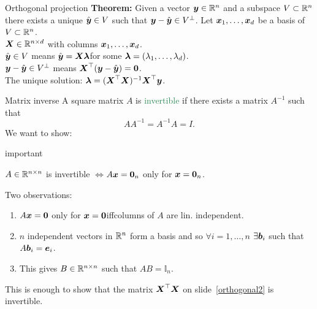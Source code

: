 \documentclass[11pt,aspectratio=169]{beamer}
\begin{document}
\begin{frame}[label=orthogonal2]{Orthogonal projection}
		\textbf{Theorem: }Given a vector $\boldsymbol y\in \mathbb R^n$ and a subspace $V\subset \mathbb R^n$ there exists a unique $\hat{\boldsymbol y}\in V$ such that \;\;$\boldsymbol y-\hat{\boldsymbol y}\in V^\perp$.
	Let $\boldsymbol x_1,\ldots,\boldsymbol x_d$ be a basis of $V\subset \mathbb R^n$.\\[.3cm]
	$\boldsymbol X\in \mathbb R^{n\times d}$ with columns  $\boldsymbol x_1,\ldots,\boldsymbol x_d$.\\[.5cm]
	$\hat{\boldsymbol y}\in V$ means \quad $\hat{\boldsymbol y}=\boldsymbol X\boldsymbol \lambda$\quad  for some $\boldsymbol \lambda=(\lambda_1,\ldots,\lambda_d)$.\\[.3cm]
	$\boldsymbol y-\hat{\boldsymbol y}\in V^\perp$ \quad means \quad $\boldsymbol X^\top(\boldsymbol y-\hat{\boldsymbol y})=\boldsymbol 0$.\\[.5cm]
	The unique solution: \quad $\boldsymbol \lambda=(\boldsymbol X^\top \boldsymbol X)^{-1}\boldsymbol X^\top\boldsymbol y$.
\end{frame}


\begin{frame}{Matrix inverse}
A square matrix $A$ is \textcolor{SeaGreen}{invertible} if there exists a matrix $A^{-1}$ such that
$$
A A^{-1}=A^{-1}A=I.
$$
	We want to show:
		\begin{beamercolorbox}[wd=\paperwidth,sep=0pt]{important}	
		\begin{center}
$A\in \mathbb R^{n\times n}$ is invertible \quad $\Longleftrightarrow$\quad $A\boldsymbol x=\boldsymbol 0_n$ only for $\boldsymbol x= \boldsymbol 0_n$.		
		\end{center}
\end{beamercolorbox}
Two observations:
\begin{enumerate}
	\item $A\boldsymbol x=\boldsymbol 0$ only for $\boldsymbol x=\boldsymbol 0$\quad iff\quad columns of $A$ are lin. independent.
	\item $n$ independent vectors in $\mathbb R^n$ form a basis and so $\forall i=1,\ldots, n$ $\exists \boldsymbol b_i$ such that $A\boldsymbol b_i=\boldsymbol e_i$.
	\item This gives $B\in \mathbb R^{n\times n}$ such that $AB=\mathbb I_n$.
\end{enumerate}
\bigskip

This is enough to show that the matrix $\boldsymbol X^\top\boldsymbol X$ on slide~\ref{orthogonal2} is invertible.\\
\end{frame}
\end{document}
